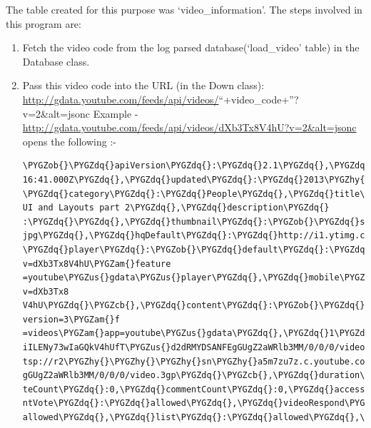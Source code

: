 \documentclass[a4paper,12pt,oneside]{sphinxmanual}
\def\PYGZus{\char`\_}
\def\PYGZob{\char`\{}
\def\PYGZcb{\char`\}}
\def\PYGZam{\char`\&}
\def\PYGZhy{\char`\-}
\def\PYGZdq{\char`\"}
\begin{document}
The table created for this purpose was `video\_information'. The steps involved in this program are:
\begin{enumerate}
\item {} 
Fetch the video code from the log parsed database(`load\_video' table) in the Database class.

\item {} 
Pass this video code into the URL (in the Down class): \href{http://gdata.youtube.com/feeds/api/videos/}{http://gdata.youtube.com/feeds/api/videos/}``+video\_code+''?v=2\&alt=jsonc Example - \href{http://gdata.youtube.com/feeds/api/videos/dXb3Tx8V4hU?v=2\&alt=jsonc}{http://gdata.youtube.com/feeds/api/videos/dXb3Tx8V4hU?v=2\&alt=jsonc} opens the following :-

\begin{Verbatim}[commandchars=\\\{\}]
\PYGZob{}\PYGZdq{}apiVersion\PYGZdq{}:\PYGZdq{}2.1\PYGZdq{},\PYGZdq{}data\PYGZdq{}:\PYGZob{}\PYGZdq{}id\PYGZdq{}:\PYGZdq{}dXb3Tx8V4hU\PYGZdq{},\PYGZdq{}uploaded\PYGZdq{}:\PYGZdq{}2013\PYGZhy{}02\PYGZhy{}23T11:
16:41.000Z\PYGZdq{},\PYGZdq{}updated\PYGZdq{}:\PYGZdq{}2013\PYGZhy{}02\PYGZhy{}23T11:16:41.000Z\PYGZdq{},\PYGZdq{}uploader\PYGZdq{}:\PYGZdq{}aakashlab\PYGZdq{},
\PYGZdq{}category\PYGZdq{}:\PYGZdq{}People\PYGZdq{},\PYGZdq{}title\PYGZdq{}:\PYGZdq{}Android UI and Layouts part 2\PYGZdq{},\PYGZdq{}description\PYGZdq{}
:\PYGZdq{}\PYGZdq{},\PYGZdq{}thumbnail\PYGZdq{}:\PYGZob{}\PYGZdq{}sqDefault\PYGZdq{}:\PYGZdq{}http://i1.ytimg.com/vi/dXb3Tx8V4hU/default.
jpg\PYGZdq{},\PYGZdq{}hqDefault\PYGZdq{}:\PYGZdq{}http://i1.ytimg.com/vi/dXb3Tx8V4hU/hqdefault.jpg\PYGZdq{}\PYGZcb{},
\PYGZdq{}player\PYGZdq{}:\PYGZob{}\PYGZdq{}default\PYGZdq{}:\PYGZdq{}http://www.youtube.com/watch?v=dXb3Tx8V4hU\PYGZam{}feature
=youtube\PYGZus{}gdata\PYGZus{}player\PYGZdq{},\PYGZdq{}mobile\PYGZdq{}:\PYGZdq{}http://m.youtube.com/details?v=dXb3Tx8
V4hU\PYGZdq{}\PYGZcb{},\PYGZdq{}content\PYGZdq{}:\PYGZob{}\PYGZdq{}5\PYGZdq{}:\PYGZdq{}http://www.youtube.com/v/dXb3Tx8V4hU?version=3\PYGZam{}f
=videos\PYGZam{}app=youtube\PYGZus{}gdata\PYGZdq{},\PYGZdq{}1\PYGZdq{}:\PYGZdq{}rtsp://r2\PYGZhy{}\PYGZhy{}\PYGZhy{}sn\PYGZhy{}a5m7zu7z.c.youtube.com/C
iILENy73wIaGQkV4hUfT\PYGZus{}d2dRMYDSANFEgGUgZ2aWRlb3MM/0/0/0/video.3gp\PYGZdq{},\PYGZdq{}6\PYGZdq{}:\PYGZdq{}r
tsp://r2\PYGZhy{}\PYGZhy{}\PYGZhy{}sn\PYGZhy{}a5m7zu7z.c.youtube.com/CiILENy73wIaGQkV4hUfT\PYGZus{}d2dRMYESARFE
gGUgZ2aWRlb3MM/0/0/0/video.3gp\PYGZdq{}\PYGZcb{},\PYGZdq{}duration\PYGZdq{}:308,\PYGZdq{}viewCount\PYGZdq{}:371,\PYGZdq{}favori
teCount\PYGZdq{}:0,\PYGZdq{}commentCount\PYGZdq{}:0,\PYGZdq{}accessControl\PYGZdq{}:\PYGZob{}\PYGZdq{}comment\PYGZdq{}:\PYGZdq{}allowed\PYGZdq{},\PYGZdq{}comme
ntVote\PYGZdq{}:\PYGZdq{}allowed\PYGZdq{},\PYGZdq{}videoRespond\PYGZdq{}:\PYGZdq{}moderated\PYGZdq{},\PYGZdq{}rate\PYGZdq{}:\PYGZdq{}allowed\PYGZdq{},\PYGZdq{}embed\PYGZdq{}:\PYGZdq{}
allowed\PYGZdq{},\PYGZdq{}list\PYGZdq{}:\PYGZdq{}allowed\PYGZdq{},\PYGZdq{}autoPlay\PYGZdq{}:\PYGZdq{}allowed\PYGZdq{},\PYGZdq{}syndicate\PYGZdq{}:\PYGZdq{}allowed\PYGZdq{}\PYGZcb{}\PYGZcb{}\PYGZcb{}
\end{Verbatim}


\end{enumerate}
\end{document}
